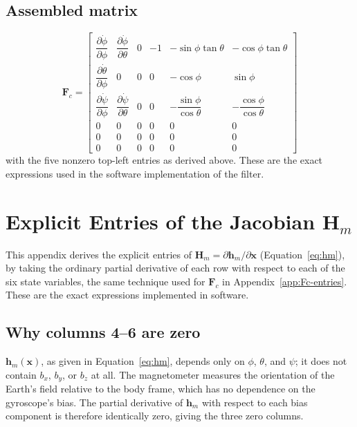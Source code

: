 \documentclass[12pt,a4paper]{article}
\newcommand{\bx}{\bm{x}}
\newcommand{\bF}{\bm{F}}
\begin{document}
{\subsection{Assembled matrix}

\begin{equation}
  \bF_c =
  \begin{bmatrix}
    \dfrac{\partial \dot\phi}{\partial \phi} & \dfrac{\partial \dot\phi}{\partial \theta} & 0 & -1 & -\sin\phi\tan\theta & -\cos\phi\tan\theta \\[4pt]
    \dfrac{\partial \dot\theta}{\partial \phi} & 0 & 0 & 0 & -\cos\phi & \sin\phi \\[4pt]
    \dfrac{\partial \dot\psi}{\partial \phi} & \dfrac{\partial \dot\psi}{\partial \theta} & 0 & 0 & -\dfrac{\sin\phi}{\cos\theta} & -\dfrac{\cos\phi}{\cos\theta} \\[4pt]
    0 & 0 & 0 & 0 & 0 & 0 \\
    0 & 0 & 0 & 0 & 0 & 0 \\
    0 & 0 & 0 & 0 & 0 & 0
  \end{bmatrix}
  \label{eq:Fc-explicit}
\end{equation}
with the five nonzero top-left entries as derived above. These are the
exact expressions used in the software implementation of the filter.

\section{Explicit Entries of the Jacobian \texorpdfstring{$\bm{H}_m$}{Hm}}
\label{app:Hm-entries}

This appendix derives the explicit entries of
$\bm{H}_m = \partial\bm{h}_m/\partial\bx$ (Equation~\eqref{eq:hm}), by
taking the ordinary partial derivative of each row with respect to
each of the six state variables, the same technique used for $\bm{F}_c$
in Appendix~\ref{app:Fc-entries}. These are the exact expressions
implemented in software.

\subsection{Why columns 4--6 are zero}

$\bm{h}_m(\bx)$, as given in Equation~\eqref{eq:hm}, depends only on
$\phi$, $\theta$, and $\psi$; it does not contain $b_x$, $b_y$, or
$b_z$ at all. The magnetometer measures the orientation of the Earth's
field relative to the body frame, which has no dependence on the
gyroscope's bias. The partial derivative of $\bm{h}_m$ with respect to
each bias component is therefore identically zero, giving the three
zero columns.

}
\end{document}
